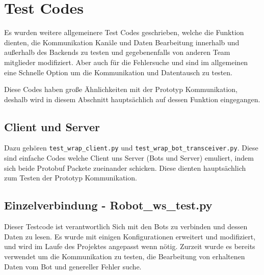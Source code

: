\section{Test Codes}
Es wurden weitere allgemeinere Test Codes geschrieben, 
welche die Funktion dienten, die Kommunikation Kanäle und Daten Bearbeitung innerhalb 
und außerhalb des Backends zu testen und gegebenenfalls von anderen Team mitglieder modifiziert.
Aber auch für die Fehlersuche 
und sind im allgemeinen eine Schnelle Option um die Kommunikation und Datentausch zu testen.

Diese Codes haben große Ähnlichkeiten mit der Prototyp Kommunikation, 
deshalb wird in diesem Abschnitt hauptsächlich auf dessen Funktion eingegangen.

\subsection{Client und Server}
Dazu gehören \texttt{test\_wrap\_client.py} und \texttt{test\_wrap\_bot\_transceiver.py}.
Diese sind einfache Codes welche Client uns Server (Bots und Server) emuliert, 
indem sich beide Protobuf Packete zueinander schicken. 
Diese dienten hauptsächlich zum Testen der Prototyp Kommunikation.

\subsection{Einzelverbindung - Robot\_ws\_test.py}
Dieser Testcode ist verantwortlich Sich mit den Bots zu verbinden und dessen Daten zu lesen.
Es wurde mit einigen Konfigurationen erweitert und modifiziert, 
und wird im Laufe des Projektes angepasst wenn nötig.
Zurzeit wurde es bereits verwendet um die Kommunikation zu testen, 
die Bearbeitung von erhaltenen Daten vom Bot und genereller Fehler suche.
